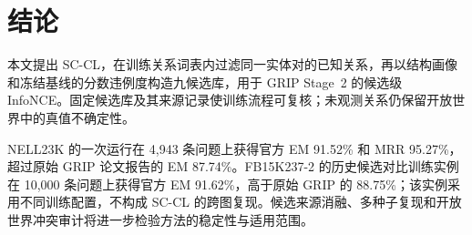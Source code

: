 \section{结论}

本文提出 SC-CL，在训练关系词表内过滤同一实体对的已知关系，再以结构画像和冻结基线的分数违例度构造九候选库，用于 GRIP Stage~2 的候选级 InfoNCE。固定候选库及其来源记录使训练流程可复核；未观测关系仍保留开放世界中的真值不确定性。

NELL23K 的一次运行在 4,943 条问题上获得官方 EM 91.52\% 和 MRR 95.27\%，超过原始 GRIP 论文报告的 EM 87.74\%。FB15K237-2 的历史候选对比训练实例在 10,000 条问题上获得官方 EM 91.62\%，高于原始 GRIP 的 88.75\%；该实例采用不同训练配置，不构成 SC-CL 的跨图复现。候选来源消融、多种子复现和开放世界冲突审计将进一步检验方法的稳定性与适用范围。
